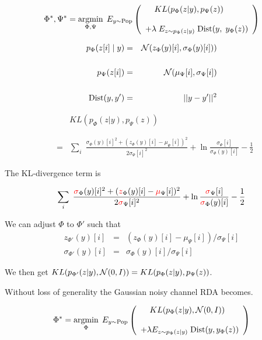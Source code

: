 {$$\Phi^*,\Psi^* = \operatorname*{argmin}_{\Phi,\Psi}\;E_{y\sim \mathrm{Pop}} \left(\begin{array}{l}\;\;\;\;KL(p_\Phi(z|y),p_\Psi(z)) \\
\\
+ \lambda \; E_{z\sim p_\Phi(z|y)}\;\mathrm{Dist}(y,\;y_\Phi(z))\end{array}\right)$$

{\color{red}
\begin{eqnarray*}
p_\Phi(z[i]\;|\;y) & = & {\cal N}(z_\Phi(y)[i],\sigma_\Phi(y)[i])) \\
\\
p_\Psi(z[i]) & = & {\cal N}(\mu_\Psi[i],\sigma_\Psi[i]) \\
\\
\mathrm{Dist}(y,y') & = & ||y-y'||^2
\end{eqnarray*}
}


\begin{eqnarray*}
& & KL(p_\Phi(z|y),p_\Psi(z)) \\
\\
\\
& = & \sum_i \;\frac{\sigma_\Phi(y)[i]^2 + (z_\Phi(y)[i]-\mu_\Psi[i])^2}{2 \sigma_\Psi[i]^2}
+ \ln\frac{\sigma_\Psi[i]}{\sigma_\Phi(y)[i]} - \frac{1}{2}
\end{eqnarray*}



The KL-divergence term is
    
$$\sum_i \;\frac{{\color{red} \sigma}_\Phi(y)[i]^2 +({\color{red}
z}_\Phi(y)[i] - {\color{red} \mu}_\Psi[i])^2}{2
{\color{red} \sigma}_\Psi[i]^2}
+ \ln\frac{{\color{red} \sigma}_\Psi[i]}{{\color{red} \sigma}_\Phi(y)[i]}
- \frac{1}{2}$$

\vfill
We can adjust $\Phi$ to $\Phi'$ such that
\begin{eqnarray*}
z_{\Phi'}(y)[i] & = & (z_\Phi(y)[i] - \mu_\Psi[i])/\sigma_\Psi[i] \\
\sigma_{\Phi'}(y)[i] & = & \sigma_\Phi(y)[i]/\sigma_\Psi[i]
\end{eqnarray*}

\vfill
We then get {\color{red} $KL(p_{\Phi'}(z|y),{\cal N}(0,I)) = KL(p_{\Phi}(z|y),p_\Psi(z))$}.


\vfill
Without loss of generality the Gaussian noisy channel RDA becomes.

{\color{red} $$\Phi^* = \operatorname*{argmin}_{\Phi}\; E_{y \sim \mathrm{Pop}}\left(\begin{array}{l}\;\;\;\;KL(p_\Phi(z|y),{\cal N}(0,I)) \\
\\
+ \lambda E_{z \sim p_\Phi(z|y)}\;\mathrm{Dist}(y,y_\Phi(z))\end{array}\right) $$}

}
